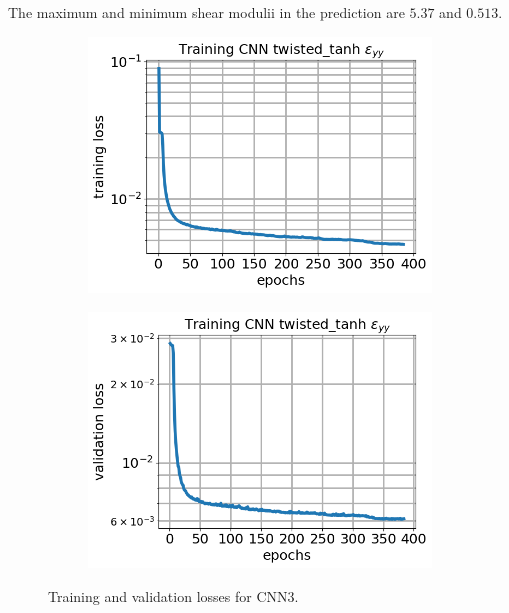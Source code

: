 \documentclass[12pt]{article}
\newcommand{\nhghalfwidth}{0.48\linewidth}
\newcommand{\nhgtotalheight}{4cm}
\begin{document}
The maximum and minimum shear modulii in the prediction are $5.37$ and $0.513$.

\begin{figure}[!h]
  \centering
  \begin{subfigure}[c]{\nhghalfwidth}
    \centering
    \includegraphics[totalheight=\nhgtotalheight]{Figures/Results3/loss.png}
  \end{subfigure}
%  
  \begin{subfigure}[c]{\nhghalfwidth}
    \centering
    \includegraphics[totalheight=\nhgtotalheight]{Figures/Results3/val_loss.png}
  \end{subfigure}
  \caption{\label{fig:cnn3losses} Training and validation losses for CNN3.}
\end{figure}
\end{document}
